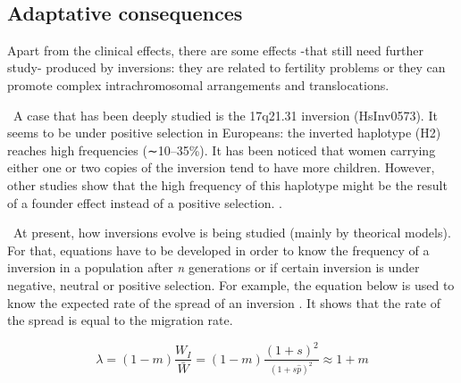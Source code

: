 \documentclass[a4paper,12pt]{article}
\begin{document}
\
\subsection{Adaptative consequences}
Apart from the clinical effects, there are some effects -that still need further study- produced by inversions: they are related to fertility problems or they can promote complex intrachromosomal arrangements and translocations. 

\
A case that has been deeply studied is the 17q21.31 inversion (HsInv0573). It seems to be under positive selection in Europeans: the inverted haplotype (H2) reaches high frequencies (∼10–35\%). It has been noticed that  women carrying either one or two copies of the inversion tend to have more children. However, other studies show that the high frequency of this haplotype might be the result of a founder effect instead of a positive selection.  \cite{puig_human_2015}.

\
At present, how inversions evolve is being studied (mainly by theorical models). For that, equations have to be developed in order to know the frequency of a inversion in a population after {\em n} generations or if certain inversion is under negative, neutral or positive selection. For example, the equation below is used to know the expected rate of the spread of an inversion \cite{kirkpatrick_chromosome_2006}. It shows that the rate of the spread is equal to the migration rate.


\begin{equation}
 \lambda = (1-m)\frac{W_{I}}{\bar{W}}=(1-m)\frac{{(1+s)^2}}{^(1+s\hat{p})^2}\approx 1+m
 \label{Equation1}
\end{equation}

\newpage


\end{document}
